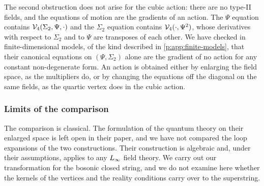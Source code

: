 The second obstruction does not arise for the cubic action: there are no type-II fields, and the equations of motion are the gradients of an action.
The $\Psi$ equation contains $\mathcal{V}_{4}(\Sigma_2, \Psi, \cdot)$ and the $\Sigma_2$ equation contains $\mathcal{V}_{4}(\cdot, \Psi^2)$, whose derivatives with respect to $\Sigma_2$ and to $\Psi$ are transposes of each other.
We have checked in finite-dimensional models, of the kind described in \cref{p:app:finite-models}, that their canonical equations on $(\Psi, \Sigma_2)$ alone are the gradient of no action for any constant non-degenerate form.
An action is obtained either by enlarging the field space, as the multipliers do, or by changing the equations off the diagonal on the same fields, as the quartic vertex does in the cubic action.

\subsubsection{Limits of the comparison}
\label{p:sec:barcobar:limits}

The comparison is classical.
The formulation of the quantum theory on their enlarged space is left open in their paper, and we have not compared the loop expansions of the two constructions.
Their construction is algebraic and, under their assumptions, applies to any $L_\infty$ field theory.
We carry out our transformation for the bosonic closed string, and we do not examine here whether the kernels of the vertices and the reality conditions carry over to the superstring.
